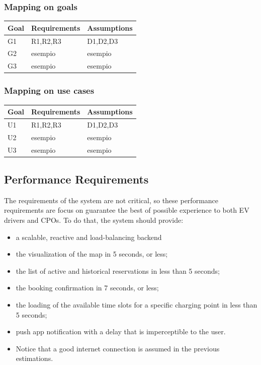 \subsubsection{Mapping on goals}
\begin{table}[H]
    \begin{tabularx}{\textwidth}{XXX}
        \toprule
        \textbf{Goal} & \textbf{Requirements} & \textbf{Assumptions} \\ \midrule
        G1            & R1,R2,R3              & D1,D2,D3             \\
        G2            & esempio               & esempio              \\
        G3            & esempio               & esempio              \\ \bottomrule
    \end{tabularx}
\end{table}
\subsubsection{Mapping on use cases}
\begin{table}[H]
    \begin{tabularx}{\textwidth}{XXX}
        \toprule
        \textbf{Goal} & \textbf{Requirements} & \textbf{Assumptions} \\ \midrule
        U1            & R1,R2,R3              & D1,D2,D3             \\
        U2            & esempio               & esempio              \\
        U3            & esempio               & esempio              \\ \bottomrule
    \end{tabularx}
\end{table}

\subsection{Performance Requirements}
The requirements of the system are not critical, so these performance requirements
are focus on guarantee the best of possible experience to both EV drivers and CPOs.
To do that, the system should provide:
\begin{itemize}
    \item a scalable, reactive and load-balancing backend
    \item the visualization of the map in 5 seconds, or less;
    \item the list of active and historical reservations in less than 5 seconds;
    \item the booking confirmation in 7 seconds, or less;
    \item the loading of the available time slots for a specific charging point in less than 5 seconds;
    \item push app notification with a delay that is imperceptible to the user.
    \item Notice that a good internet connection is assumed in the previous estimations.
\end{itemize}

